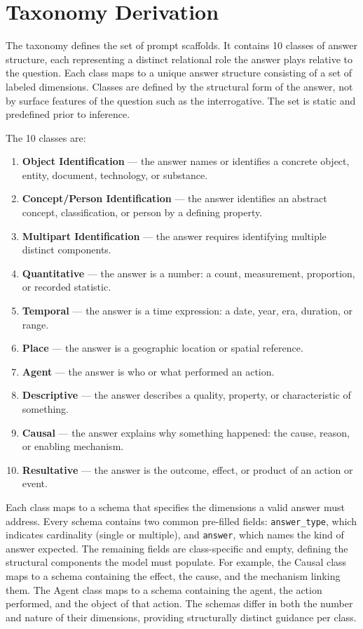 \documentclass[master]{thesis}
\begin{document}
\section{Taxonomy Derivation}

The taxonomy defines the set of prompt scaffolds. It contains 10 classes of answer structure, each representing a distinct relational role the answer plays relative to the question. Each class maps to a unique answer structure consisting of a set of labeled dimensions. Classes are defined by the structural form of the answer, not by surface features of the question such as the interrogative. The set is static and predefined prior to inference.

The 10 classes are:

\begin{enumerate}
  \item \textbf{Object Identification} --- the answer names or identifies a concrete object, entity, document, technology, or substance.
  \item \textbf{Concept/Person Identification} --- the answer identifies an abstract concept, classification, or person by a defining property.
  \item \textbf{Multipart Identification} --- the answer requires identifying multiple distinct components.
  \item \textbf{Quantitative} --- the answer is a number: a count, measurement, proportion, or recorded statistic.
  \item \textbf{Temporal} --- the answer is a time expression: a date, year, era, duration, or range.
  \item \textbf{Place} --- the answer is a geographic location or spatial reference.
  \item \textbf{Agent} --- the answer is who or what performed an action.
  \item \textbf{Descriptive} --- the answer describes a quality, property, or characteristic of something.
  \item \textbf{Causal} --- the answer explains why something happened: the cause, reason, or enabling mechanism.
  \item \textbf{Resultative} --- the answer is the outcome, effect, or product of an action or event.
\end{enumerate}

Each class maps to a schema that specifies the dimensions a valid answer must address. Every schema contains two common pre-filled fields: \texttt{answer\_type}, which indicates cardinality (single or multiple), and \texttt{answer}, which names the kind of answer expected. The remaining fields are class-specific and empty, defining the structural components the model must populate. For example, the Causal class maps to a schema containing the effect, the cause, and the mechanism linking them. The Agent class maps to a schema containing the agent, the action performed, and the object of that action. The schemas differ in both the number and nature of their dimensions, providing structurally distinct guidance per class.
\end{document}
